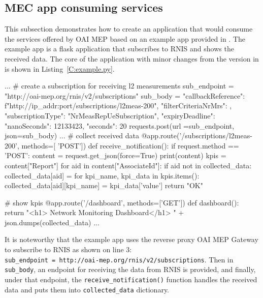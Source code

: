 \documentclass[12pt,a4paper,twoside]{report}
\begin{document}
\subsection{MEC app consuming services}
This subsection demonstrates how to create an application that would consume the services offered by OAI MEP based on an example app provided in \cite{oai-blueprint-git}. The example app is a flask application that subscribes to RNIS and shows the received data. The core of the application with minor changes from the version in \cite{oai-blueprint-git} is shown in Listing~\ref{C:example.py}.

\begin{flask}[caption={example-app.py}, label={C:example.py}]
	...
	# create a subscription for receiving l2 measurements
	sub_endpoint = "http://oai-mep.org/rnis/v2/subscriptions"
	sub_body ={
	"callbackReference": f"http://{ip_addr}:{port}/subscriptions/l2meas-200",
	"filterCriteriaNrMrs": {},
	"subscriptionType": "NrMeasRepUeSubscription",
	"expiryDeadline": {
		"nanoSeconds": 12133423,
		"seconds": 20
	}
	}
	requests.post(url =sub_endpoint, json=sub_body)
	...
	# collect received data
	@app.route('/subscriptions/l2meas-200', methods=[ 'POST'])
	def receive_notification():
		if request.method == 'POST':
			content = request.get_json(force=True)
			print(content)
			kpis = content["Report"]
			for aid in content["AssociateId"]:
				if aid not in collected_data:
					collected_data[aid] = {}
				for kpi_name, kpi_data in kpis.items():
					collected_data[aid][kpi_name] = kpi_data['value']
		return "OK"

	# show kpis
	@app.route('/dashboard', methods=['GET'])
	def dashboard():
		return "<h1> Network Monitoring Dashboard</h1> " + json.dumps(collected_data)
	...
\end{flask}

It is noteworthy that the example app uses the reverse proxy OAI MEP Gateway to subscribe to RNIS as shown on line 3:  \\\verb |sub_endpoint = http://oai-mep.org/rnis/v2/subscriptions|. Then in \verb|sub_body|, an endpoint for receiving the data from RNIS is provided, and finally, under that endpoint, the \verb|receive_notification()| function handles the received data and puts them into \verb|collected_data| dictionary.
%
\end{document}
